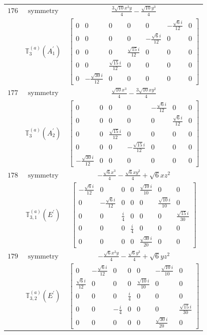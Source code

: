 \documentclass[fleqn,8pt,landscape]{jsarticle}
\begin{document}
\begin{longtable}{ccc}
$ 176 $ & $ \text{symmetry} $ & $ \frac{3 \sqrt{10} x^{2} y}{4} - \frac{\sqrt{10} y^{3}}{4} $ \\
$  $ & $ \mathbb{T}_{3}^{(a)}(A_{1}^{\prime}) $ & $ \begin{bmatrix} 0 & 0 & 0 & 0 & 0 & - \frac{\sqrt{6} i}{12} & 0 \\ 0 & 0 & 0 & 0 & - \frac{\sqrt{6} i}{12} & 0 & 0 \\ 0 & 0 & 0 & \frac{\sqrt{15} i}{12} & 0 & 0 & 0 \\ 0 & 0 & \frac{\sqrt{15} i}{12} & 0 & 0 & 0 & 0 \\ 0 & - \frac{\sqrt{30} i}{12} & 0 & 0 & 0 & 0 & 0 \end{bmatrix} $ \\ \hline
$ 177 $ & $ \text{symmetry} $ & $ \frac{\sqrt{10} x^{3}}{4} - \frac{3 \sqrt{10} x y^{2}}{4} $ \\
$  $ & $ \mathbb{T}_{3}^{(a)}(A_{2}^{\prime}) $ & $ \begin{bmatrix} 0 & 0 & 0 & 0 & - \frac{\sqrt{6} i}{12} & 0 & 0 \\ 0 & 0 & 0 & 0 & 0 & \frac{\sqrt{6} i}{12} & 0 \\ 0 & 0 & \frac{\sqrt{15} i}{12} & 0 & 0 & 0 & 0 \\ 0 & 0 & 0 & - \frac{\sqrt{15} i}{12} & 0 & 0 & 0 \\ - \frac{\sqrt{30} i}{12} & 0 & 0 & 0 & 0 & 0 & 0 \end{bmatrix} $ \\ \hline
$ 178 $ & $ \text{symmetry} $ & $ - \frac{\sqrt{6} x^{3}}{4} - \frac{\sqrt{6} x y^{2}}{4} + \sqrt{6} x z^{2} $ \\
$  $ & $ \mathbb{T}_{3,1}^{(a)}(E^{\prime}) $ & $ \begin{bmatrix} - \frac{\sqrt{6} i}{12} & 0 & 0 & 0 & \frac{\sqrt{10} i}{10} & 0 & 0 \\ 0 & - \frac{\sqrt{6} i}{12} & 0 & 0 & 0 & \frac{\sqrt{10} i}{10} & 0 \\ 0 & 0 & \frac{i}{4} & 0 & 0 & 0 & \frac{\sqrt{15} i}{30} \\ 0 & 0 & 0 & \frac{i}{4} & 0 & 0 & 0 \\ 0 & 0 & 0 & 0 & \frac{\sqrt{30} i}{20} & 0 & 0 \end{bmatrix} $ \\ \hline
$ 179 $ & $ \text{symmetry} $ & $ - \frac{\sqrt{6} x^{2} y}{4} - \frac{\sqrt{6} y^{3}}{4} + \sqrt{6} y z^{2} $ \\
$  $ & $ \mathbb{T}_{3,2}^{(a)}(E^{\prime}) $ & $ \begin{bmatrix} 0 & - \frac{\sqrt{6} i}{12} & 0 & 0 & 0 & - \frac{\sqrt{10} i}{10} & 0 \\ \frac{\sqrt{6} i}{12} & 0 & 0 & 0 & \frac{\sqrt{10} i}{10} & 0 & 0 \\ 0 & 0 & 0 & \frac{i}{4} & 0 & 0 & 0 \\ 0 & 0 & - \frac{i}{4} & 0 & 0 & 0 & \frac{\sqrt{15} i}{30} \\ 0 & 0 & 0 & 0 & 0 & \frac{\sqrt{30} i}{20} & 0 \end{bmatrix} $ \\ \hline

\end{longtable}
\end{document}

